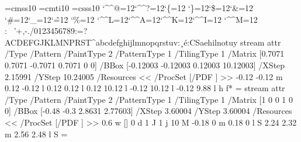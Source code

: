 \font\THFa=cmss10
\font\THFc=cmti10
\font\THFb=csss10
\begingroup
\catcode`\^^@=12\catcode`\^^?=12\catcode`\{=12
\catcode`\}=12\catcode`\$=12\catcode`\&=12
\catcode`\#=12\catcode`\_=12\catcode`\~=12
\catcode`\%=12
\catcode`\^^L=12\catcode`\^^A=12\catcode`\^^K=12\catcode`\^^I=12
\catcode`\^^M=12
\THFa:^^0b^^0f^^12'+,-./0123456789:=?ACDEFGJKLMNPRST^abcdefghijlmnopqrstuv\endinclude{}\THFb:^^b8^^e9\endinclude{}\THFc:CSaehilnotuy\endinclude\endgroup
\immediate\pdfobj stream attr {/Type /Pattern
/PaintType 2 /PatternType 1 /TilingType 1
/Matrix [0.7071 0.7071 -0.7071 0.7071 0 0]
/BBox [-0.12003 -0.12003 0.12003 10.12003]
/XStep 2.15991
/YStep 10.24005
/Resources << /ProcSet [/PDF ] >>} {
-0.12 -0.12 m
0.12 -0.12 l
0.12 0.12 l
0.12 10.12 l
-0.12 10.12 l
-0.12 9.88 l
h
f*
}\newcount\THPb\THPb=\pdflastobj
\immediate\pdfobj stream attr {/Type /Pattern
/PaintType 2 /PatternType 1 /TilingType 1
/Matrix [1 0 0 1 0 0]
/BBox [-0.48 -0.3 2.8631 2.77603]
/XStep 3.60004
/YStep 3.60004
/Resources << /ProcSet [/PDF ] >>} {
0.6 w
[] 0 d
1 J
1 j
10 M
-0.18 0 m
0.18 0 l
S
2.24 2.32 m
2.56 2.48 l
S
}\newcount\THPa\THPa=\pdflastobj
